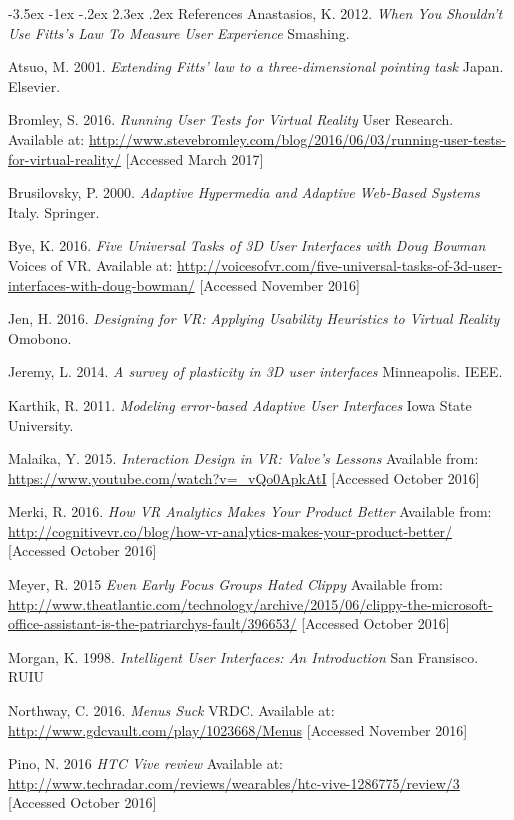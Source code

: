 \documentclass[12pt]{article}
\makeatletter
\renewcommand{\section}{\@startsection {section}{1}{\z@}%
             {-3.5ex \@plus -1ex \@minus -.2ex}%
             {2.3ex \@plus .2ex}%
             {\normalfont\Large\scshape\bfseries}}
\makeatother
\begin{document}
\section{References}
Anastasios, K. 2012. \emph{When You Shouldn't Use Fitts's Law To Measure User Experience} Smashing. 

Atsuo, M. 2001. \emph{Extending Fitts' law to a three-dimensional pointing task} Japan. Elsevier. 

Bromley, S. 2016. \emph{Running User Tests for Virtual Reality} User Research. Available at: \url{http://www.stevebromley.com/blog/2016/06/03/running-user-tests-for-virtual-reality/} [Accessed March 2017]

Brusilovsky, P. 2000. \emph{Adaptive Hypermedia and Adaptive Web-Based Systems} Italy. Springer.

Bye, K. 2016. \emph{Five Universal Tasks of 3D User Interfaces with Doug Bowman} Voices of VR. Available at: \url{http://voicesofvr.com/five-universal-tasks-of-3d-user-interfaces-with-doug-bowman/} [Accessed November 2016]

Jen, H. 2016. \emph{Designing for VR: Applying Usability Heuristics to Virtual Reality} Omobono. 

Jeremy, L. 2014. \emph{A survey of plasticity in 3D user interfaces} Minneapolis. IEEE. 

Karthik, R. 2011. \emph{Modeling error-based Adaptive User Interfaces} Iowa State University. 

Malaika, Y. 2015. \emph{Interaction Design in VR: Valve's Lessons } Available from: \url{https://www.youtube.com/watch?v=_vQo0ApkAtI} [Accessed October 2016]

Merki, R. 2016. \emph{How VR Analytics Makes Your Product Better} Available from: \url{http://cognitivevr.co/blog/how-vr-analytics-makes-your-product-better/} [Accessed October 2016]

Meyer, R. 2015 \emph{Even Early Focus Groups Hated Clippy} Available from: \url{http://www.theatlantic.com/technology/archive/2015/06/clippy-the-microsoft-office-assistant-is-the-patriarchys-fault/396653/} [Accessed October 2016]

Morgan, K. 1998. \emph{Intelligent User Interfaces: An Introduction} San Fransisco. RUIU 

Northway, C. 2016. \emph{Menus Suck} VRDC. Available at: \url{http://www.gdcvault.com/play/1023668/Menus} [Accessed November 2016]

Pino, N. 2016 \emph{HTC Vive review} Available at: \url{http://www.techradar.com/reviews/wearables/htc-vive-1286775/review/3} [Accessed October 2016]
\end{document}
